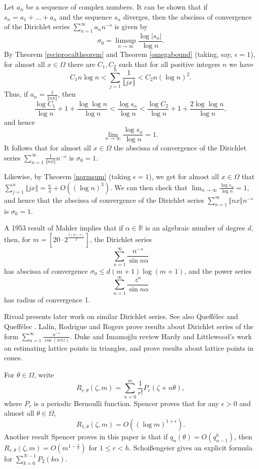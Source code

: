 \documentclass{article}
\newcommand{\norm}[1]{\left\Vert #1 \right\Vert}
\begin{document}
Let $a_n$ be a sequence of complex numbers.
It can be  shown \cite[pp.~292--293, \S 9.14]{titchmarsh} that if $s_n=a_1+\ldots+a_n$ and the sequence $s_n$ diverges, then the abscissa of convergence of the Dirichlet series $\sum_{n=1}^\infty a_n n^{-s}$ is given by
\[
\sigma_0=\limsup_{n \to \infty} \frac{\log |s_n|}{\log n}.
\]
By Theorem \ref{reciprocaltheorem} and Theorem \ref{omegabound} (taking, say, $\epsilon=1$), for almost all $x \in \Omega$ there are $C_1,C_2$ such that for all positive integers $n$ we have
\[
C_1 n \log n< \sum_{j=1}^n \frac{1}{\norm{jx}} < C_2 n(\log n)^2.
\]
Thus, if $a_n=\frac{1}{\norm{nx}}$, then
\[
\frac{\log C_1}{\log n} + 1 + \frac{\log \log n}{\log n} < \frac{\log s_n}{\log n} < \frac{\log C_2}{\log n} + 1 + \frac{2 \log \log n}{\log n},
\]
and hence
\[
\lim_{n \to \infty} \frac{\log s_n}{\log n}=1.
\]
It follows that for almost all $x \in \Omega$ the abscissa of convergence of the Dirichlet series $\sum_{n=1}^\infty \frac{1}{\norm{nx}} n^{-s}$ is $\sigma_0=1$.

Likewise, by Theorem \ref{normsum} (taking $\epsilon=1$), we get for almost all $x \in \Omega$ that $\sum_{j=1}^n \norm{jx}=\frac{n}{4}+O\left((\log n)^3\right)$.
We can then check that $\lim_{n \to \infty} \frac{\log s_n}{\log n}=1$, and hence that the abscissa of convergence of the Dirichlet series
$\sum_{n=1}^\infty \norm{nx} n^{-s}$ is $\sigma_0=1$.




A 1953 result of Mahler \cite[pp. 107--108]{feldman} implies that if $\alpha \in \mathbb{R}$ is
an algebraic number of degree $d$, then, for $m=[20\cdot 2^{\frac{5(d-1)}{2}}]$, the Dirichlet series
\[
\sum_{n=1}^\infty \frac{n^{-s}}{\sin n\alpha}
\]
has abscissa of convergence $\sigma_0 \leq d(m+1)\log(m+1)$, and the power series
\[
\sum_{n=1}^\infty \frac{z^n}{\sin n\alpha}
\]
has radius of convergence 1.






Rivoal \cite{MR2928508} presents later work on similar Dirichlet series. See also Queff\'elec and Queff\'elec \cite{queffelec}.
Lal\'in, Rodrigue and Rogers \cite{secant} prove results about Dirichlet series of the form
$\sum_{n=1}^\infty \frac{n^{-s}}{\cos(n \pi z)}$.
Duke and Imamo{\=g}lu \cite{MR2127435} review Hardy and Littlewood's work on estimating lattice points in triangles, and 
prove results about lattice points in cones.


For $\theta \in \Omega$,  write
\[
R_{r,\theta}(\zeta,m)=\sum_{n=0}^m \frac{1}{r!} P_r(\zeta+n\theta),
\]
where $P_r$ is a periodic Bernoulli function.
Spencer \cite{spencer} proves that for any $\epsilon>0$ and almost all $\theta \in \Omega$, 
\[
R_{1,\theta}(\zeta,m) = O\left( (\log m)^{1+\epsilon}\right).
\]
Another result Spencer proves in this paper is that if $q_n(\theta) = O(q_{n-1}^h)$, then $R_{r,\theta}(\zeta,m)=O(m^{1-\frac{r}{h}})$ for $1 \leq r < h$.
Schoi{\ss}engeier \cite{MR1012966} gives an explicit formula for $\sum_{k=0}^{N-1} P_2(k\alpha)$.
\end{document}
